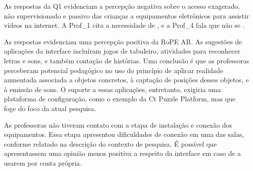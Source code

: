 As respostas da Q1 evidenciam a percepção negativa sobre o acesso exagerado, não supervisionado e passivo das crianças a equipamentos eletrônicos para assistir vídeos na internet. A Prof\_1 cita a necessidade de , e a Prof\_4 fala que não se . 

As respostas evidenciam uma percepção positiva da RoPE AR. As sugestões de aplicações da interface incluíram jogos de tabuleiro, atividades para reconhecer letras e sons, e também contação de histórias. Uma conclusão é que as professoras perceberam potencial pedagógico no uso do princípio de aplicar realidade aumentada associada a objetos concretos, à captação de posições desses objetos, e à emissão de sons. O suporte a essas aplicações, entretanto, exigiria uma plataforma de configuração, como o exemplo da Ct Puzzle Platform, mas que foge do foco da atual pesquisa. 

As professoras não tiveram contato com a etapa de instalação e conexão dos equipamentos. Essa etapa apresentou dificuldades de conexão em uma das salas, conforme relatado na descrição do contexto de pesquisa. É possível que apresentassem uma opinião menos positiva a respeito da interface em caso de a usarem por conta própria.